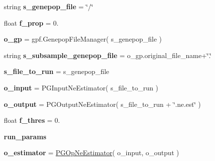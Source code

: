 \begin{DoxyCompactItemize}
\item 
string {\bfseries s\+\_\+genepop\+\_\+file} = \char`\"{}/\char`\"{}\hypertarget{namespacenegui_1_1pgopneestimator_abd2f865b6c90be20725b38a3f9abe0d6}{}\label{namespacenegui_1_1pgopneestimator_abd2f865b6c90be20725b38a3f9abe0d6}

\item 
float {\bfseries f\+\_\+prop} = 0.\hypertarget{namespacenegui_1_1pgopneestimator_adbcd497fa5f921163432c42451b40caf}{}\label{namespacenegui_1_1pgopneestimator_adbcd497fa5f921163432c42451b40caf}

\item 
{\bfseries o\+\_\+gp} = gpf.\+Genepop\+File\+Manager( s\+\_\+genepop\+\_\+file )\hypertarget{namespacenegui_1_1pgopneestimator_a2a15c53902b0cf304fbbcd7cca8c422a}{}\label{namespacenegui_1_1pgopneestimator_a2a15c53902b0cf304fbbcd7cca8c422a}

\item 
string {\bfseries s\+\_\+subsample\+\_\+genepop\+\_\+file} = o\+\_\+gp.\+original\+\_\+file\+\_\+name+\char`\"{}.\char`\"{}\hypertarget{namespacenegui_1_1pgopneestimator_a2dc7d11211bb2787bba6428bf2297d24}{}\label{namespacenegui_1_1pgopneestimator_a2dc7d11211bb2787bba6428bf2297d24}

\item 
{\bfseries s\+\_\+file\+\_\+to\+\_\+run} = s\+\_\+genepop\+\_\+file\hypertarget{namespacenegui_1_1pgopneestimator_a5bac9bb118c3ddb4f9b5457a924834d5}{}\label{namespacenegui_1_1pgopneestimator_a5bac9bb118c3ddb4f9b5457a924834d5}

\item 
{\bfseries o\+\_\+input} = P\+G\+Input\+Ne\+Estimator( s\+\_\+file\+\_\+to\+\_\+run )\hypertarget{namespacenegui_1_1pgopneestimator_a4d3e68431275c1b44d4675fd5830cc5d}{}\label{namespacenegui_1_1pgopneestimator_a4d3e68431275c1b44d4675fd5830cc5d}

\item 
{\bfseries o\+\_\+output} = P\+G\+Output\+Ne\+Estimator( s\+\_\+file\+\_\+to\+\_\+run + \char`\"{}.ne.\+est\char`\"{} )\hypertarget{namespacenegui_1_1pgopneestimator_abc93d890dd7f095954d3220bb9484175}{}\label{namespacenegui_1_1pgopneestimator_abc93d890dd7f095954d3220bb9484175}

\item 
float {\bfseries f\+\_\+thres} = 0.\hypertarget{namespacenegui_1_1pgopneestimator_a10fd09063d78e9c0578f9c077fa636a5}{}\label{namespacenegui_1_1pgopneestimator_a10fd09063d78e9c0578f9c077fa636a5}

\item 
{\bfseries run\+\_\+params}\hypertarget{namespacenegui_1_1pgopneestimator_a5667af4f089ff66e2068be1325179790}{}\label{namespacenegui_1_1pgopneestimator_a5667af4f089ff66e2068be1325179790}

\item 
{\bfseries o\+\_\+estimator} = \hyperlink{classnegui_1_1pgopneestimator_1_1PGOpNeEstimator}{P\+G\+Op\+Ne\+Estimator}( o\+\_\+input, o\+\_\+output )\hypertarget{namespacenegui_1_1pgopneestimator_a1cdcbf37871f21d6d4c80ba06b7104e5}{}\label{namespacenegui_1_1pgopneestimator_a1cdcbf37871f21d6d4c80ba06b7104e5}

\end{DoxyCompactItemize}



